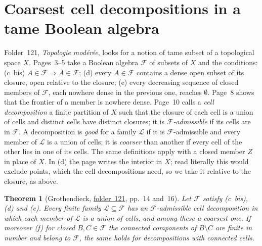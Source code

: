 \documentclass[11pt,a4paper]{amsart}
\newtheorem{theorem}{Theorem}[section]
\theoremstyle{definition}
\theoremstyle{remark}
\newcommand{\fac}[1]{\href{https://grothendieck.umontpellier.fr/#1.pdf}{folder~#1}}
\begin{document}
\section{Coarsest cell decompositions in a tame Boolean algebra}\label{sec:tame}

Folder~121, \emph{Topologie modérée}, looks for a notion of tame subset of a topological space $X$. Pages~3--5 take a Boolean algebra $\mathcal F$ of subsets of $X$ and the conditions: (c~bis) $A \in \mathcal F \Rightarrow \overline A \in \mathcal F$; (d) every $A \in \mathcal F$ contains a dense open subset of its closure, open relative to the closure; (e) every decreasing sequence of closed members of $\mathcal F$, each nowhere dense in the previous one, reaches $\emptyset$. Page~8 shows that the frontier of a member is nowhere dense. Page~10 calls a \emph{cell decomposition} a finite partition of $X$ such that the closure of each cell is a union of cells and distinct cells have distinct closures; it is \emph{$\mathcal F$-admissible} if its cells are in $\mathcal F$. A decomposition is \emph{good} for a family $\mathcal L$ if it is $\mathcal F$-admissible and every member of $\mathcal L$ is a union of cells; it is \emph{coarser} than another if every cell of the other lies in one of its cells. The same definitions apply with a closed member $Z$ in place of $X$. In (d) the page writes the interior in $X$; read literally this would exclude points, which the cell decompositions need, so we take it relative to the closure, as above.

\begin{theorem}[Grothendieck, \fac{121}, pp.~14 and~16]\label{thm:cells}
Let $\mathcal F$ satisfy (c~bis), (d) and (e). Every finite family $\mathcal L \subseteq \mathcal F$ has an $\mathcal F$-admissible cell decomposition in which each member of $\mathcal L$ is a union of cells, and among these a coarsest one. If moreover (f) for closed $B, C \in \mathcal F$ the connected components of $B \setminus C$ are finite in number and belong to $\mathcal F$, the same holds for decompositions with connected cells.
\end{theorem}
\end{document}
